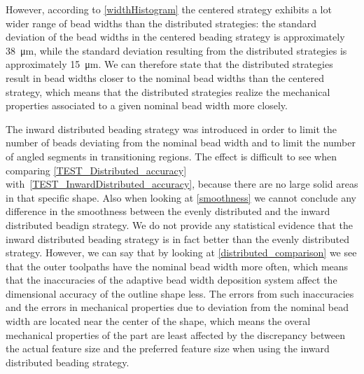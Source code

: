 However, according to \cref{widthHistogram} the centered strategy exhibits a lot wider range of bead widths than the distributed strategies:
the standard deviation of the bead widths in the centered beading strategy is approximately \SI{38}{\micro\meter}, while the standard deviation resulting from the distributed strategies is approximately \SI{15}{\micro\meter}.
We can therefore state that the distributed strategies result in bead widths closer to the nominal bead widths than the centered strategy, which means that the distributed strategies realize the mechanical properties associated to a given nominal bead width more closely.

The inward distributed beading strategy was introduced in order to limit the number of beads deviating from the nominal bead width and to limit the number of angled segments in transitioning regions.
The effect is difficult to see when comparing \cref{TEST_Distributed_accuracy} with~\ref{TEST_InwardDistributed_accuracy}, because there are no large solid areas in that specific shape.
Also when looking at \cref{smoothness} we cannot conclude any difference in the smoothness between the evenly distributed and the inward distributed beadign strategy.
We do not provide any statistical evidence that the inward distributed beading strategy is in fact better than the evenly distributed strategy.
However, we can say that by looking at \cref{distributed_comparison} we see that the outer toolpaths have the nominal bead width more often, which means that the inaccuracies of the adaptive bead width deposition system affect the dimensional accuracy of the outline shape less.
The errors from such inaccuracies and the errors in mechanical properties due to deviation from the nominal bead width are located near the center of the shape, which means the overal mechanical properties of the part are least affected by the discrepancy between the actual feature size and the preferred feature size when using the inward distributed beading strategy.






